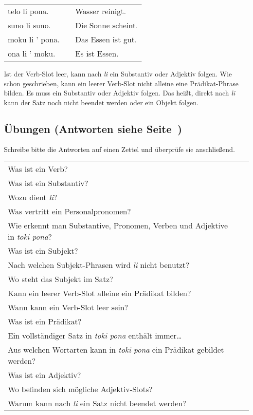 \begin{supertabular}{p{5cm}|ll}
telo li pona. && Wasser reinigt. \\
suno li suno. && Die Sonne scheint. \\
moku li ' pona. && Das Essen ist gut. \\
ona li ' moku. && Es ist Essen. \\
\end{supertabular} 

Ist der Verb-Slot leer, kann nach \textit{li} ein Substantiv oder Adjektiv folgen. 
Wie schon geschrieben, kann  ein leerer Verb-Slot nicht alleine eine Prädikat-Phrase bilden. 
Es muss ein Substantiv oder Adjektiv folgen. 
Das heißt, direkt nach \textit{li} kann der Satz noch nicht beendet werden oder ein Objekt folgen.
%
\newpage
\subsection*{Übungen (Antworten siehe Seite~\pageref{'basic_sentences'})}
%

Schreibe bitte die Antworten auf einen Zettel und überprüfe sie anschließend. 

\begin{supertabular}{p{5,5cm}|ll}
Was ist ein Verb? &&  \\  %
Was ist ein Substantiv? &&  \\  %
Wozu dient \textit{li}? &&   \\ %
Was vertritt ein Personalpronomen? &&  \\ %
Wie erkennt man Substantive, Pronomen, Verben und Adjektive in \textit{toki pona}? &&  \\  %
Was ist ein Subjekt? &&  \\ %
Nach welchen Subjekt-Phrasen wird \textit{li} nicht benutzt? && \\ %
Wo steht das Subjekt im Satz? &&  \\  %
Kann ein leerer Verb-Slot alleine ein Prädikat bilden? &&  \\  %
Wann kann ein Verb-Slot leer sein? &&   \\  %
Was ist ein Prädikat? &&   \\  %
Ein vollständiger Satz in \textit{toki pona} enthält immer\dots &&  \\  %
Aus welchen Wortarten kann in \textit{toki pona} ein Prädikat gebildet werden? &&  \\  %
Was ist ein Adjektiv? &&   \\ %
Wo befinden sich mögliche Adjektiv-Slots? &&  \\  %
Warum kann nach \textit{li} ein Satz nicht beendet werden? &&  \\ %
\end{supertabular} 

